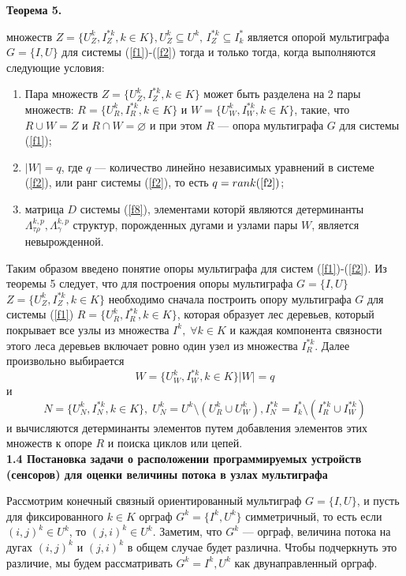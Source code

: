 \documentclass[14pt]{extarticle}%
\begin{document}
\textbf{Теорема 5.} { множеств $Z=\{U^k_Z, I^{*k}_Z, k\in K\}, U^k_Z\subseteq U^k,\, I^{*k}_Z\subseteq I^*_k$ является опорой мультиграфа $G=\{I,U\}$ для системы (\ref{f1})-(\ref{f2}) тогда и только тогда, когда выполняются следующие условия:

\begin{enumerate}
    \item Пара множеств $Z=\{U^k_Z, I^{*k}_Z, k\in K\}$ может быть разделена на 2 пары множеств: $R=\{U^k_R, I^{*k}_R, k\in K\}$ и $W=\{U^k_W, I^{*k}_W, k\in K\}$, такие, что $R\cup W=Z$ и $R\cap W=\varnothing$ и при этом $R$ --- опора мультиграфа $G$ для системы (\ref{f1});
    \item $|W|=q$, где $q$ --- количество линейно независимых уравнений в системе (\ref{f2}), или ранг системы (\ref{f2}), то есть $q=rank(\ref{f2})$;
    \item матрица $D$ системы (\ref{f8}), элементами которй являются детерминанты $\Lambda^{k,p}_{\tau\rho}, \Lambda^{k,p}_\gamma$ структур, порожденных дугами и узлами пары $W$, является невырожденной.
\end{enumerate}
}
Таким образом введено понятие опоры мультиграфа для систем (\ref{f1})-(\ref{f2}). Из теоремы 5 следует, что для построения опоры мультиграфа $G=\{I,U\}$ \\$Z=\{U^k_Z, I^{*k}_Z, k\in K\}$ необходимо сначала построить опору мультиграфа $G$ для системы (\ref{f1}) $R=\{U^k_R, I^{*k}_R, k\in K\}$, которая образует лес деревьев, который покрывает все узлы из множества $I^k,\;\forall k\in K$ и каждая компонента связности этого леса деревьев включает ровно один узел из множества $I^{*k}_R$. Далее произвольно выбирается \
$$W=\{U^k_W, I^{*k}_W, k\in K\} |W|=q$$
и 
$$N=\{U^k_N, I^{*k}_N, k\in K\},\; U^k_N=U^k\setminus (U^k_R\cup U^k_W), I^{*k}_N=I^*_k\setminus(I^{*k}_R\cup I^{*k}_W)$$
и вычисляются детерминанты элементов путем добавления элементов этих множеств к опоре $R$ и поиска циклов или цепей.\\

\textbf{1.4 Постановка задачи о расположении программируемых устройств (сенсоров) для оценки величины потока в узлах мультиграфа}

Рассмотрим конечный связный ориентированный мультиграф $G=\{I,U\}$, и пусть для фиксированного $k\in K$ орграф $G^k=\{I^k, U^k\}$ симметричный, то есть если $(i,j)^k\in U^k$, то $(j,i)^k\in U^k$. Заметим, что $G^k$ --- орграф, величина потока на дугах $(i,j)^k$ и $(j,i)^k$ в общем случае будет различна. Чтобы подчеркнуть это различие, мы будем рассматривать $G^k={I^k, U^k}$ как двунаправленный орграф.
\end{document}
